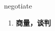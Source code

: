
\begin{frame}
{\huge negotiate}
\begin{center}
\begin{enumerate}\Large
  \item \textbf{商量，谈判}
\end{enumerate}
\end{center}
\end{frame}
